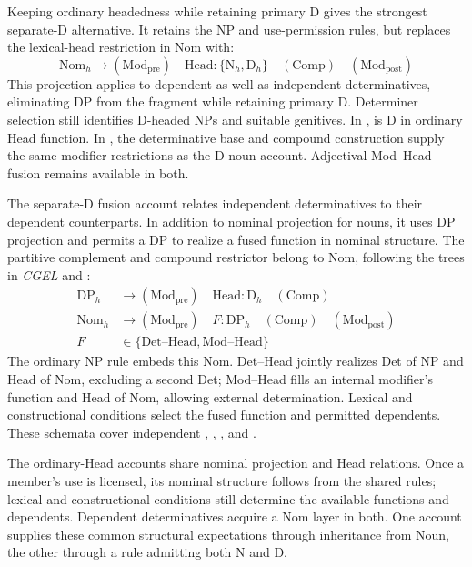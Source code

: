 \documentclass[12pt]{article}
\begin{document}
Keeping ordinary headedness while retaining primary D gives the strongest separate-D alternative. It retains the NP and use-permission rules, but replaces the lexical-head restriction in Nom with:
\[
\mathrm{Nom}_{h}\to(\mathrm{Mod}_{\mathrm{pre}})\quad\mathrm{Head}:\{\mathrm{N}_{h},\mathrm{D}_{h}\}\quad(\mathrm{Comp})\quad(\mathrm{Mod}_{\mathrm{post}})
\]
This projection applies to dependent as well as independent determinatives, eliminating DP from the fragment while retaining primary D. Determiner selection still identifies D-headed NPs and suitable genitives. In ,  is D in ordinary Head function. In , the determinative base and compound construction supply the same modifier restrictions as the D-noun account. Adjectival Mod--Head fusion remains available in both.

The separate-D fusion account relates independent determinatives to their dependent counterparts. In addition to nominal projection for nouns, it uses DP projection and permits a DP to realize a fused function in nominal structure. The partitive complement and compound restrictor belong to Nom, following the trees in \textit{CGEL} and \textcite[582]{Payne2007}:
\[
\begin{aligned}
\mathrm{DP}_{h} &\to (\mathrm{Mod}_{\mathrm{pre}})\quad \mathrm{Head}:\mathrm{D}_{h}\quad (\mathrm{Comp}) \\
\mathrm{Nom}_{h} &\to (\mathrm{Mod}_{\mathrm{pre}})\quad F:\mathrm{DP}_{h}\quad (\mathrm{Comp})\quad (\mathrm{Mod}_{\mathrm{post}}) \\
F&\in\{\mathrm{Det\text{--}Head},\mathrm{Mod\text{--}Head}\}
\end{aligned}
\]
The ordinary NP rule embeds this Nom. Det--Head jointly realizes Det of NP and Head of Nom, excluding a second Det; Mod--Head fills an internal modifier's function and Head of Nom, allowing external determination. Lexical and constructional conditions select the fused function and permitted dependents. These schemata cover independent , , , and .

The ordinary-Head accounts share nominal projection and Head relations. Once a member's use is licensed, its nominal structure follows from the shared rules; lexical and constructional conditions still determine the available functions and dependents. Dependent determinatives acquire a Nom layer in both. One account supplies these common structural expectations through inheritance from Noun, the other through a rule admitting both N and D.
\end{document}
